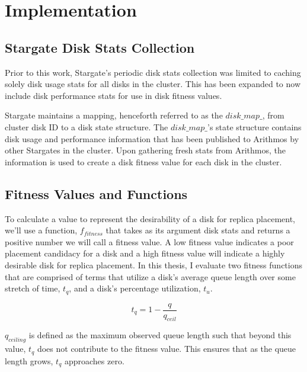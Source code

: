 \documentclass[12pt]{article}
\begin{document}

\newpage
\section{Implementation}

  \subsection{Stargate Disk Stats Collection}

  Prior to this work, Stargate's periodic disk stats collection was limited to
  caching solely disk usage stats for all disks in the cluster.  This has been
  expanded to now include disk performance stats for use in disk fitness
  values.

  Stargate maintains a mapping, henceforth referred to as the $disk\_map\_$,
  from cluster disk ID to a disk state structure. The $disk\_map\_$'s state
  structure contains disk usage and performance information that has been
  published to Arithmos by other Stargates in the cluster. Upon gathering fresh
  stats from Arithmos, the information is used to create a disk fitness value
  for each disk in the cluster.

  \subsection{Fitness Values and Functions}

  To calculate a value to represent the desirability of a disk for replica
  placement, we'll use a function, $f_{fitness}$ that takes as its argument
  disk stats and returns a positive number we will call a fitness value. A low
  fitness value indicates a poor placement candidacy for a disk and a high
  fitness value will indicate a highly desirable disk for replica placement. In
  this thesis, I evaluate two fitness functions that are comprised of terms
  that utilize a disk's average queue length over some stretch of time,
  $t_{q}$, and a disk's percentage utilization, $t_{u}$.

  \begin{equation}
    t_{q} = 1 - \frac{q}{q_{ceil}}
  \end{equation}

  $q_{ceiling}$ is defined as the maximum observed queue length such that
  beyond this value, $t_{q}$ does not contribute to the fitness
  value. This ensures that as the queue length grows, $t_{q}$
  approaches zero. 
\end{document}
